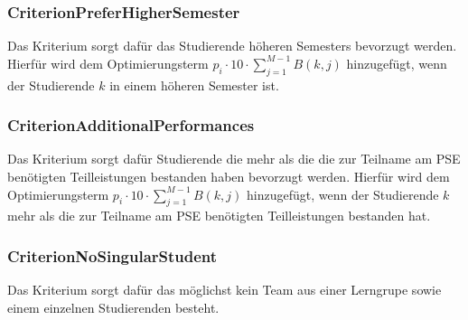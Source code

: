 \documentclass[parskip=full]{scrartcl}
\begin{document}
\subsubsection{CriterionPreferHigherSemester}
Das Kriterium sorgt dafür das Studierende höheren Semesters bevorzugt werden. Hierfür wird dem Optimierungsterm
$p_i \cdot 10 \cdot \sum_{j = 1}^{M-1} B(k,j)$ hinzugefügt, wenn der
Studierende $k$ in einem höheren Semester ist.
\subsubsection{CriterionAdditionalPerformances}
Das Kriterium sorgt dafür Studierende die mehr als die die zur Teilname am PSE
benötigten Teilleistungen bestanden haben bevorzugt werden. Hierfür wird dem Optimierungsterm
$p_i \cdot 10 \cdot \sum_{j = 1}^{M-1} B(k,j)$ hinzugefügt, wenn der Studierende
$k$ mehr als die zur Teilname am PSE benötigten Teilleistungen bestanden hat.
\subsubsection{CriterionNoSingularStudent}
Das Kriterium sorgt dafür das möglichst kein Team aus einer Lerngrupe sowie
einem einzelnen Studierenden besteht.
\end{document}
